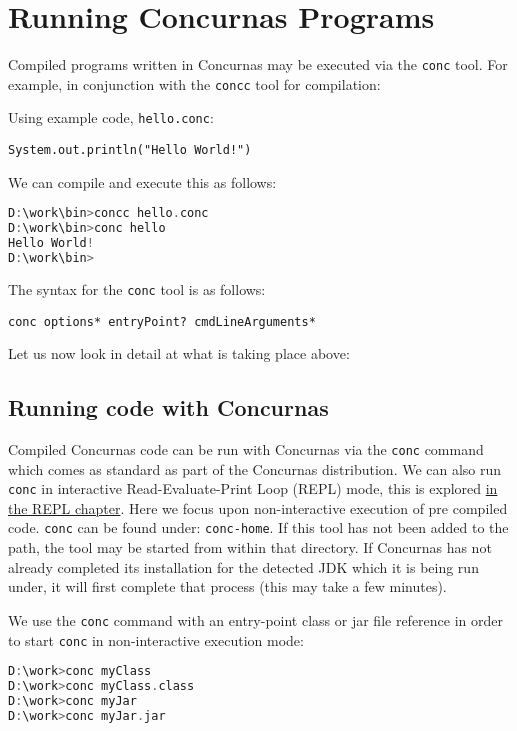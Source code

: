 \documentclass[conc-doc]{subfiles}
\begin{document}
	\chapter[Running Concurnas Programs]{Running Concurnas Programs}
	\label{ch:conc}

Compiled programs written in Concurnas may be executed via the \lstinline{conc} tool. For example, in conjunction with the \lstinline{concc} tool for compilation:


Using example code, \lstinline{hello.conc}:
\begin{lstlisting}
System.out.println("Hello World!")
\end{lstlisting}

We can compile and execute this as follows:
\begin{lstlisting}[language=C]
D:\work\bin>concc hello.conc
D:\work\bin>conc hello
Hello World!
D:\work\bin>
\end{lstlisting}

The syntax for the \lstinline{conc} tool is as follows:

\begin{center}
	\lstinline{conc options* entryPoint? cmdLineArguments*}
\end{center}

Let us now look in detail at what is taking place above:

\section{Running code with Concurnas}
Compiled Concurnas code can be run with Concurnas via the \lstinline{conc} command which comes as standard as part of the Concurnas distribution. We can also run \lstinline{conc} in interactive Read-Evaluate-Print Loop (REPL) mode, this is explored \hyperref[ch:repl]{in the REPL chapter}. Here we focus upon non-interactive execution of pre compiled code. \lstinline{conc} can be found under: \lstinline{conc-home}. If this tool has not been added to the path, the tool may be started from within that directory. If Concurnas has not already completed its installation for the detected JDK which it is being run under, it will first complete that process (this may take a few minutes).

We use the \lstinline{conc} command with an entry-point class or jar file reference in order to start \lstinline{conc} in non-interactive execution mode:

\begin{lstlisting}[language=C]
D:\work>conc myClass
D:\work>conc myClass.class
D:\work>conc myJar
D:\work>conc myJar.jar
\end{lstlisting}
\end{document}
